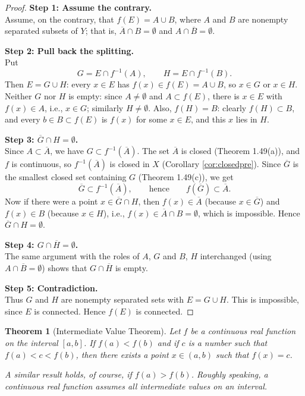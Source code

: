 \documentclass{article}
\theoremstyle{mythm}
\newtheorem{theorem}{Theorem}[section]
\begin{document}
\begin{proof}
\textbf{Step 1: Assume the contrary.}\\
Assume, on the contrary, that $f(E) = A \cup B$, where $A$ and $B$ are nonempty separated subsets of $Y$; that is, $\overline{A} \cap B = \emptyset$ and $A \cap \overline{B} = \emptyset$.

\textbf{Step 2: Pull back the splitting.}\\
Put
\[
G = E \cap f^{-1}(A), \qquad H = E \cap f^{-1}(B).
\]
Then $E = G \cup H$: every $x \in E$ has $f(x) \in f(E) = A \cup B$, so $x \in G$ or $x \in H$. Neither $G$ nor $H$ is empty: since $A \neq \emptyset$ and $A \subset f(E)$, there is $x \in E$ with $f(x) \in A$, i.e., $x \in G$; similarly $H \neq \emptyset$. Also, $f(H) = B$: clearly $f(H) \subset B$, and every $b \in B \subset f(E)$ is $f(x)$ for some $x \in E$, and this $x$ lies in $H$.

\textbf{Step 3: $\overline{G} \cap H = \emptyset$.}\\
Since $A \subset \overline{A}$, we have $G \subset f^{-1}(\overline{A})$. The set $\overline{A}$ is closed (Theorem 1.49(a)), and $f$ is continuous, so $f^{-1}(\overline{A})$ is closed in $X$ (Corollary \ref{cor:closedpre}). Since $\overline{G}$ is the smallest closed set containing $G$ (Theorem 1.49(c)), we get
\[
\overline{G} \subset f^{-1}(\overline{A}), \qquad\text{hence}\qquad f(\overline{G}) \subset \overline{A}.
\]
Now if there were a point $x \in \overline{G} \cap H$, then $f(x) \in \overline{A}$ (because $x \in \overline{G}$) and $f(x) \in B$ (because $x \in H$), i.e., $f(x) \in \overline{A} \cap B = \emptyset$, which is impossible. Hence $\overline{G} \cap H = \emptyset$.

\textbf{Step 4: $G \cap \overline{H} = \emptyset$.}\\
The same argument with the roles of $A$, $G$ and $B$, $H$ interchanged (using $A \cap \overline{B} = \emptyset$) shows that $G \cap \overline{H}$ is empty.

\textbf{Step 5: Contradiction.}\\
Thus $G$ and $H$ are nonempty separated sets with $E = G \cup H$. This is impossible, since $E$ is connected. Hence $f(E)$ is connected.
\end{proof}

\begin{theorem}[Intermediate Value Theorem]\label{thm:ivt}
Let $f$ be a continuous real function on the interval $[a,b]$. If $f(a) < f(b)$ and if $c$ is a number such that $f(a) < c < f(b)$, then there exists a point $x \in (a,b)$ such that $f(x) = c$.

A similar result holds, of course, if $f(a) > f(b)$. Roughly speaking, a continuous real function assumes all intermediate values on an interval.
\end{theorem}
\end{document}
